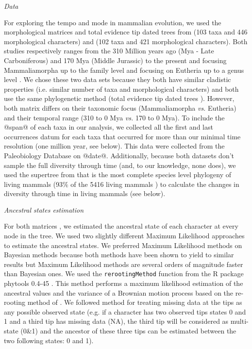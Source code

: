 \documentclass[12pt,letterpaper]{article}
\renewcommand{\subsection}[1]{%
\bigskip
\begin{center}
\begin{large}
\normalfont\itshape #1
\end{large}
\end{center}}
\begin{document}
\subsection{Data}
For exploring the tempo and mode in mammalian evolution, we used the morphological matrices and total evidence tip dated trees \cite{ronquista2012} from \cite{MEE3:MEE312084} (103 taxa and 446 morphological characters) and \cite{beckancient2014} (102 taxa and 421 morphological characters). Both studies respectively ranges from the 310 Million years ago (Mya - Late Carboniferous) and 170 Mya (Middle Jurassic) to the present and focusing Mammaliamorpha up to the family level \cite{MEE3:MEE312084} and focusing on Eutheria up to a genus level \cite{beckancient2014}. We chose these two data sets because they both have similar cladistic properties (i.e. similar number of taxa and morphological characters) and both use the same phylogenetic method (total evidence tip dated trees \cite{ronquista2012}). However, both matrix differs on their taxonomic focus (Mammaliamorpha \textit{vs.} Eutheria) and their temporal range (310 to 0 Mya \textit{vs.} 170 to 0 Mya). To include the @span@ of each taxa in our analysis, we collected all the first and last occurrences datum for each taxa that occurred for more than our minimal time resolution (one million year, see below). This data were collected from the Paleobiology Database on @date@. Additionally, because both datasets don't sample the full diversity through time (and, to our knowledge, none does), we used the supertree from \cite{fritzdiversity2013} that is the most complete species level phylogeny of living mammals (93\% of the 5416 living mammals \cite{wilson2005mammal}) to calculate the changes in diversity through time in living mammals (see below).

\subsection{Ancestral states estimation}
For both matrices \cite{MEE3:MEE312084,beckancient2014}, we estimated the ancestral state of each character at every node in the tree. We used two slightly different Maximum Likelihood approaches to estimate the ancestral states. We preferred Maximum Likelihood methods on Bayesian methods because both methods have been shown to yield to similar results \cite{royer-carenzichoosing2013} but Maximum Likelihood methods are several orders of magnitude faster than Bayesian ones. We used the \texttt{rerootingMethod} function from the R package phytools 0.4-45 \cite{phytools}. This method performs a maximum likelihood estimation of the ancestral values and the variance of a Brownian motion process based on the re-rooting method of \cite{Yang01121995}. We followed \cite{Claddis} method for treating missing data at the tips as any possible observed state (e.g. if a character has two observed tips states 0 and 1 and a third tip has missing data (NA), the third tip will be considered as multi-state (0\&1) and the ancestor of these three tips can be estimated between the two following states: 0 and 1).
\end{document}
